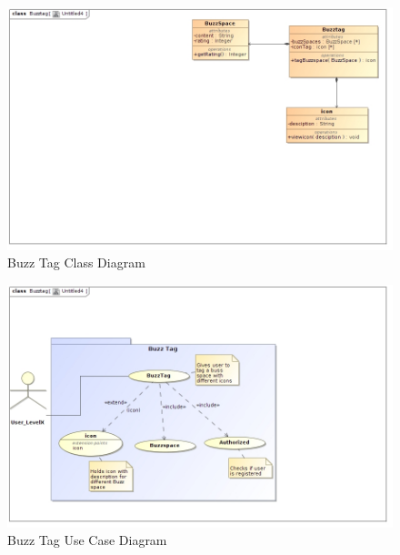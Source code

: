 \documentclass[11pt]{article}
\begin{document}
\begin{enumerate}
\begin{itemize}
\begin{itemize}
	\end{itemize}
\end{itemize}

\begin{figure}[H]	
\graphicspath{ {../Diagrams/sfiso/} }
    	\includegraphics[scale=0.5]{buzzC.jpg}
    	\caption{Buzz Tag Class Diagram}
	\end{figure}
	
	\begin{figure}[H]	
\graphicspath{ {../Diagrams/sfiso/} }
    	\includegraphics[scale=0.5]{tag.jpg}
    	\caption{Buzz Tag Use Case Diagram}
	\end{figure}



\end{enumerate}
\end{document}
